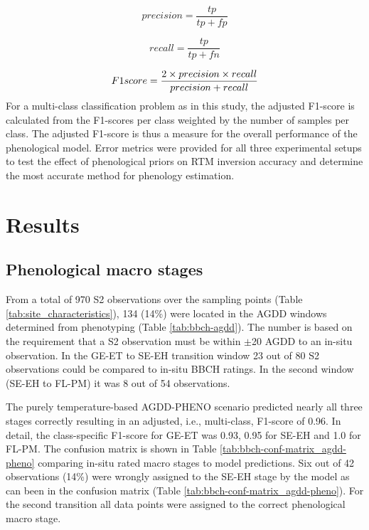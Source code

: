 \begin{equation}
    precision = \frac{tp}{tp + fp}
\end{equation}

\begin{equation}
    recall = \frac{tp}{tp + fn}
\end{equation}

\begin{equation}
    F1\-score = \frac{2 \times precision \times recall}{precision + recall}
\end{equation}
For a multi-class classification problem as in this study, the adjusted F1-score is calculated from the F1-scores per class weighted by the number of samples per class. The adjusted F1-score is thus a measure for the overall performance of the phenological model.
Error metrics were provided for all three experimental setups to test the effect of phenological priors on RTM inversion accuracy and determine the most accurate method for phenology estimation.

\section{Results}
\label{sec:results}
% 
\subsection{Phenological macro stages}
\label{subsec:res-pheno-macro stages}

From a total of 970 S2 observations over the sampling points (Table \ref{tab:site_characteristics}), 134 (14\%) were located in the AGDD windows determined from phenotyping (Table \ref{tab:bbch-agdd}). The number is based on the requirement that a S2 observation must be within $\pm$20 AGDD to an in-situ observation. In the GE-ET to SE-EH transition window 23 out of 80 S2 observations could be compared to in-situ BBCH ratings. In the second window (SE-EH to FL-PM) it was 8 out of 54 observations.

The purely temperature-based AGDD-PHENO scenario predicted nearly all three stages correctly resulting in an adjusted, i.e., multi-class, F1-score of 0.96. In detail, the class-specific F1-score for GE-ET was 0.93, 0.95 for SE-EH and 1.0 for FL-PM. The confusion matrix is shown in Table \ref{tab:bbch-conf-matrix_agdd-pheno} comparing in-situ rated macro stages to model predictions. Six out of 42 observations (14\%) were wrongly assigned to the SE-EH stage by the model as can been in the confusion matrix (Table \ref{tab:bbch-conf-matrix_agdd-pheno}). For the second transition all data points were assigned to the correct phenological macro stage.


